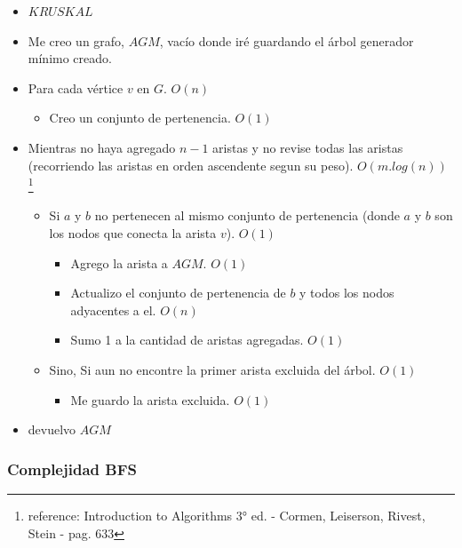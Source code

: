 \begin{itemize}
\item $KRUSKAL$
\item Me creo un grafo, $AGM$, vacío donde iré guardando el árbol generador mínimo creado.
\item Para cada vértice $v$ en $G$. $O(n)$
\begin{itemize}
	\item Creo un conjunto de pertenencia. $O(1)$
\end{itemize}
\item Mientras no haya agregado $n-1$ aristas y no revise todas las aristas (recorriendo las aristas en orden ascendente segun su peso). $O(m.log(n))$ \footnote{reference: Introduction to Algorithms 3° ed. - Cormen, Leiserson, Rivest, Stein - pag. 633}
\begin{itemize}
	\item Si $a$ y $b$ no pertenecen al mismo conjunto de pertenencia (donde $a$ y $b$ son los nodos que conecta la arista $v$). $O(1)$
	\begin{itemize}
		\item Agrego la arista a $AGM$. $O(1)$
		\item Actualizo el conjunto de pertenencia de $b$ y todos los nodos adyacentes a el. $O(n)$ 
		\item Sumo 1 a la cantidad de aristas agregadas. $O(1)$
	\end{itemize}
	\item Sino, Si aun no encontre la primer arista excluida del árbol. $O(1)$
	\begin{itemize}
		\item Me guardo la arista excluida. $O(1)$
	\end{itemize}
\end{itemize}
\item devuelvo $AGM$
\end{itemize}


\subsubsection{Complejidad BFS}

